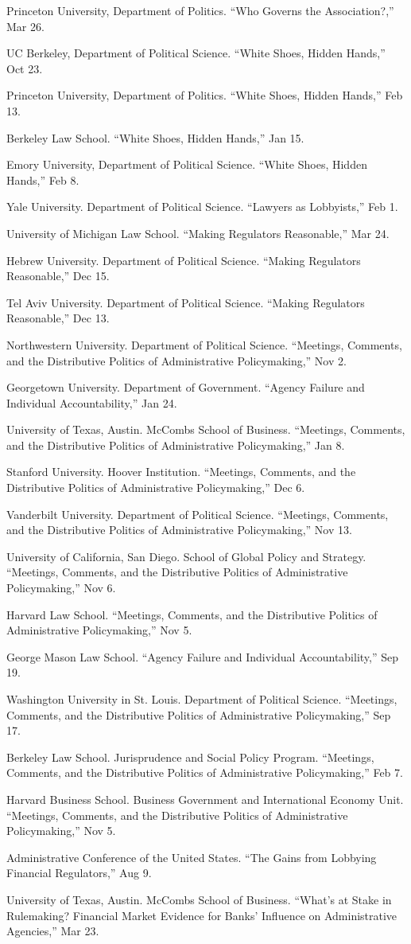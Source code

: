 \documentclass[12pt,letterpaper]{report}
\newcommand{\talk}[4]{\item[#1]{\tab{}#3. \enquote{#2,} #4.}} %
\begin{document}
    \begin{tablist}
    \talk{2026}{Who Governs the Association?}{Princeton University, Department of Politics}{Mar 26}
    \talk{2025}{White Shoes, Hidden Hands}{UC Berkeley, Department of Political Science}{Oct  23}
    \talk{2025}{White Shoes, Hidden Hands}{Princeton University, Department of Politics}{Feb 13}
    \talk{2025}{White Shoes, Hidden Hands}{Berkeley Law School}{Jan 15}
    \talk{2024}{White Shoes, Hidden Hands}{Emory University, Department of Political Science}{Feb 8}
    \talk{2023}{Lawyers as Lobbyists}{Yale University. Department of Political Science}{Feb 1}
	\talk{2022}{Making Regulators Reasonable}{University of Michigan Law School}{Mar 24}
	
    \talk{2021}{Making Regulators Reasonable}{Hebrew University. Department of Political Science}{Dec 15}
    	
	\talk{2021}{Making Regulators Reasonable}{Tel Aviv University. Department of Political Science}{Dec 13}
			
	\talk{2021}{Meetings, Comments, and the Distributive Politics of Administrative Policymaking}{Northwestern University. Department of Political Science}{Nov 2}
		
    \talk{2020}{Agency Failure and Individual Accountability}{Georgetown University. Department of Government}{Jan 24}
    \talk{2020}{Meetings, Comments, and the Distributive Politics of Administrative Policymaking}{University of Texas, Austin. McCombs School of Business}{Jan 8}
    \talk{2019}{Meetings, Comments, and the Distributive Politics of Administrative Policymaking}{Stanford University. Hoover Institution}{Dec 6}
    \talk{2019}{Meetings, Comments, and the Distributive Politics of Administrative Policymaking}{Vanderbilt University. Department of Political Science}{Nov 13}
    \talk{2019}{Meetings, Comments, and the Distributive Politics of Administrative Policymaking}{University of California, San Diego. School of Global Policy and Strategy}{Nov 6}
    \talk{2019}{Meetings, Comments, and the Distributive Politics of Administrative Policymaking}{Harvard Law School}{Nov 5}    
    \talk{2019}{Agency Failure and Individual Accountability}{George Mason Law School}{Sep 19}
    \talk{2019}{Meetings, Comments, and the Distributive Politics of Administrative Policymaking}{Washington University in St. Louis. Department of Political Science}{Sep 17}    
    \talk{2019}{Meetings, Comments, and the Distributive Politics of Administrative Policymaking}{Berkeley Law School. Jurisprudence and Social Policy Program}{Feb 7}    
    \talk{2019}{Meetings, Comments, and the Distributive Politics of Administrative Policymaking}{Harvard Business School. Business Government and International Economy Unit}{Nov 5}   
    \talk{2019}{The Gains from Lobbying Financial Regulators}{Administrative Conference of the United States}{Aug 9}    
    \talk{2018}{What’s at Stake in Rulemaking? Financial Market Evidence for Banks’ Influence on Administrative Agencies}{University of Texas, Austin. McCombs School of Business}{Mar 23}
    
    \end{tablist}
\end{document}
